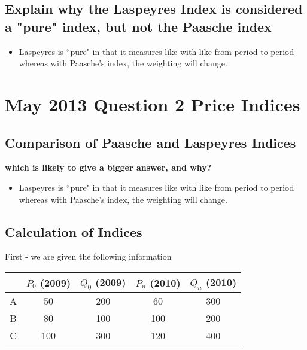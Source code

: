 \documentclass[a4paper,12pt]{article}
\begin{document}
\subsection*{Explain why the Laspeyres Index is considered a "pure" index, but not the Paasche index}
\begin{itemize}
	\item Laspeyres is ``pure" in that it measures like with like from period to period whereas with Paasche's index, the weighting will change.
\end{itemize}
\section*{May 2013 Question 2 Price Indices}

\subsection*{Comparison of Paasche and Laspeyres Indices}

\textbf{which is likely to give a bigger answer, and why?}\\

\begin{itemize}
	\item Laspeyres is ``pure" in that it measures like with like from period to period whereas with Paasche's index, the weighting will change.
\end{itemize}
\subsection*{Calculation of Indices}
First - we are given the following information
\begin{center}
	\begin{tabular}{|c|c|c|c|c|}
		\hline \rule[-2ex]{0pt}{5.5ex}  & $P_0$ (2009) & $Q_0$ (2009) & $P_n$ (2010) & $Q_n$ (2010) \\ 
		\hline \rule[-2ex]{0pt}{5.5ex} A & 50 & 200 & 60 & 300 \\ 
		\hline \rule[-2ex]{0pt}{5.5ex} B & 80 & 100 & 100 & 200 \\ 
		\hline \rule[-2ex]{0pt}{5.5ex} C & 100 & 300 & 120 & 400 \\ 
		\hline 
	\end{tabular} 
\end{center}
\end{document}
